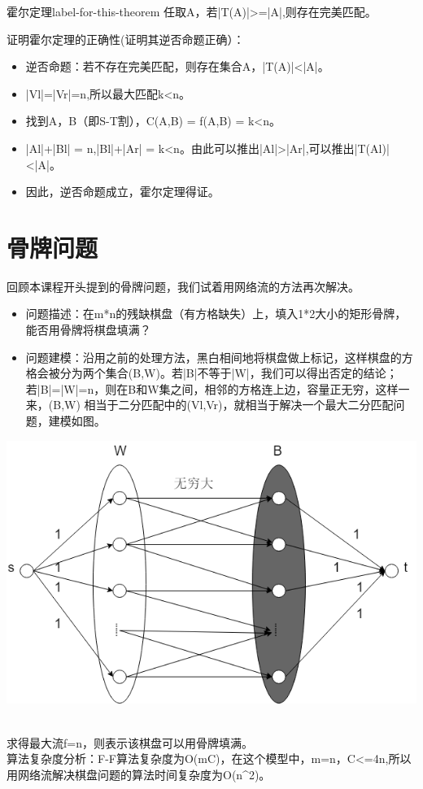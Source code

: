 \begin{theorem}{霍尔定理}{label-for-this-theorem}
  任取A\subseteqVl，若|T(A)|>=|A|,则存在完美匹配。
\end{theorem}
证明霍尔定理的正确性(证明其逆否命题正确）：
\begin{itemize}
  \item 逆否命题：若不存在完美匹配，则存在集合A，|T(A)|<|A|。
  \item |Vl|=|Vr|=n,所以最大匹配k<n。
  \item 找到A，B（即S-T割），C(A,B) = f(A,B) = k<n。
  \item |Al|+|Bl| = n,|Bl|+|Ar| = k<n。由此可以推出|Al|>|Ar|,可以推出|T(Al)|<|A|。
  \item 因此，逆否命题成立，霍尔定理得证。
\end{itemize}

\section{骨牌问题}
回顾本课程开头提到的骨牌问题，我们试着用网络流的方法再次解决。\\
\begin{itemize}
  \item 问题描述：在m*n的残缺棋盘（有方格缺失）上，填入1*2大小的矩形骨牌，能否用骨牌将棋盘填满？\\
  \item 问题建模：沿用之前的处理方法，黑白相间地将棋盘做上标记，这样棋盘的方格会被分为两个集合(B,W)。若|B|不等于|W|，我们可以得出否定的结论；若|B|=|W|=n，则在B和W集之间，相邻的方格连上边，容量正无穷，这样一来，(B,W) 相当于二分匹配中的(Vl,Vr)，就相当于解决一个最大二分匹配问题，建模如图。\\
\end{itemize}
\centerline{\includegraphics[scale=0.6]{image/networkflow4.png}}
\\求得最大流f=n，则表示该棋盘可以用骨牌填满。\\
算法复杂度分析：F-F算法复杂度为O(mC)，在这个模型中，m=n，C<=4n,所以用网络流解决棋盘问题的算法时间复杂度为O(n^2)。

